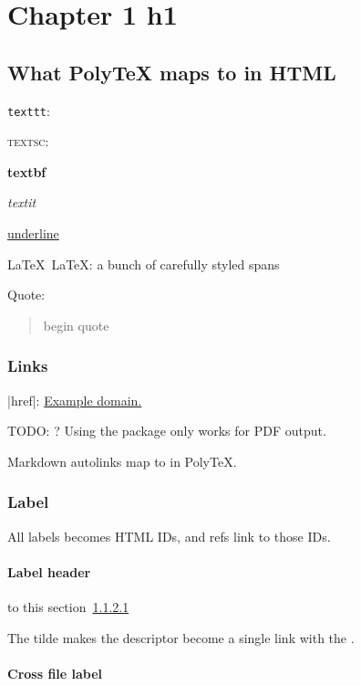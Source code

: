 \chapter{Chapter 1 h1}

\section{What PolyTeX maps to in HTML}

  \texttt{texttt}: 

  \textsc{textsc}: 

  \textbf{textbf}

  \textit{textit}

  \underline{underline}

  \LaTeX\ LaTeX: a bunch of carefully styled spans

  Quote:

  \begin{quote}
  begin quote
  \end{quote}

  \subsection{Links}

    \kode|href|: \href{http://example.com}{Example domain.}

    TODO: ? Using the package only works for PDF output.

    Markdown autolinks map to  in PolyTeX.


  \subsection{Label}

    All labels becomes HTML IDs, and refs link to those IDs.

    \subsubsection{Label header}\label{label-header}

     to this section~\ref{label-header}

      The tilde makes the descriptor  become a single link with the .

    \subsubsection{Cross file label}

